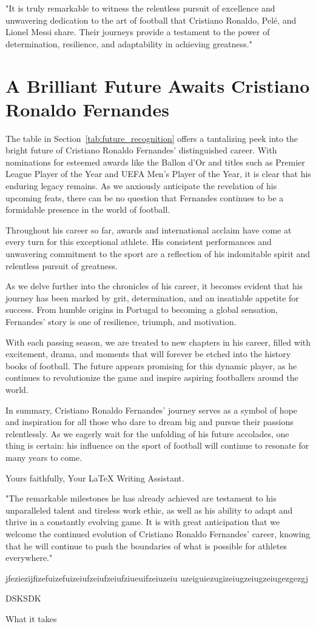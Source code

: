 \documentclass{article}
\begin{document}
"It is truly remarkable to witness the relentless pursuit of excellence and unwavering dedication to the art of football that Cristiano Ronaldo, Pelé, and Lionel Messi share. Their journeys provide a testament to the power of determination, resilience, and adaptability in achieving greatness."

 \section*{A Brilliant Future Awaits Cristiano Ronaldo Fernandes}

The table in Section~\ref{tab:future_recognition} offers a tantalizing peek into the bright future of Cristiano Ronaldo Fernandes' distinguished career. With nominations for esteemed awards like the Ballon d'Or and titles such as Premier League Player of the Year and UEFA Men's Player of the Year, it is clear that his enduring legacy remains. As we anxiously anticipate the revelation of his upcoming feats, there can be no question that Fernandes continues to be a formidable presence in the world of football.

Throughout his career so far, awards and international acclaim have come at every turn for this exceptional athlete. His consistent performances and unwavering commitment to the sport are a reflection of his indomitable spirit and relentless pursuit of greatness.

As we delve further into the chronicles of his career, it becomes evident that his journey has been marked by grit, determination, and an insatiable appetite for success. From humble origins in Portugal to becoming a global sensation, Fernandes' story is one of resilience, triumph, and motivation.

With each passing season, we are treated to new chapters in his career, filled with excitement, drama, and moments that will forever be etched into the history books of football. The future appears promising for this dynamic player, as he continues to revolutionize the game and inspire aspiring footballers around the world.

In summary, Cristiano Ronaldo Fernandes' journey serves as a symbol of hope and inspiration for all those who dare to dream big and pursue their passions relentlessly. As we eagerly wait for the unfolding of his future accolades, one thing is certain: his influence on the sport of football will continue to resonate for many years to come.

Yours faithfully,
Your LaTeX Writing Assistant.

 "The remarkable milestones he has already achieved are testament to his unparalleled talent and tireless work ethic, as well as his ability to adapt and thrive in a constantly evolving game. It is with great anticipation that we welcome the continued evolution of Cristiano Ronaldo Fernandes' career, knowing that he will continue to push the boundaries of what is possible for athletes everywhere."

jfeziezijfizefuizefuizeiufzeiufzeiufziueuifzeiuzeiu
uzeiguiezugizeiugzeiugzeiugezgezgj

DSKSDK


What it takes
\end{document}
